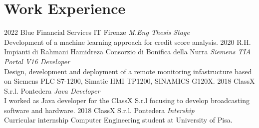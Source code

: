\documentclass[]{friggeri-cv}
\begin{document}
\section{Work Experience}
\vspace{-3mm}
\begin{entrylist}
\entry
{2022}
{Blue Financial Services IT}
{Firenze}
{\emph{M.Eng Thesis Stage}\\
Development of a machine learning approach for credit score analysis.}
\entry
{2020}
{R.H. Impianti di Rahmani Hamidreza}
{Consorzio di Bonifica della Nurra}
{\emph{Siemens TIA Portal V16 Developer}\\
Design, development and deployment of a remote monitoring infastructure based
on Siemens PLC S7-1200, Simatic HMI TP1200, SINAMICS G120X.}
\entry
{2018}
{ClassX S.r.l.}
{Pontedera}
{\emph{Java Developer} \\
I worked as Java developer for the ClassX S.r.l focusing to develop broadcasting software and hardware.}
\entry
{2018}
{ClassX S.r.l.}
{Pontedera}
{\emph{Intership} \\
Curricular internship Computer Engineering student at University of Pisa.}
\end{entrylist}
\clearpage
\end{document}
